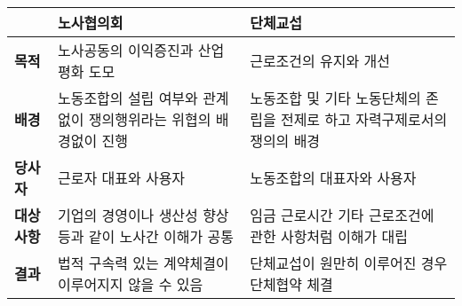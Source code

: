 \begin{tabular}{p{2cm} p{7cm} p{7cm}}
\toprule
 & \textbf{노사협의회} & \textbf{단체교섭} \\
\midrule
\textbf{목적} & 노사공동의 이익증진과 산업평화 도모 & 근로조건의 유지와 개선 \\ \midrule
\textbf{배경} & 노동조합의 설립 여부와 관계없이 쟁의행위라는 위협의 배경없이 진행 & 노동조합 및 기타 노동단체의 존립을 전제로 하고 자력구제로서의 쟁의의 배경 \\ \midrule
\textbf{당사자} & 근로자 대표와 사용자 & 노동조합의 대표자와 사용자 \\ \midrule
\textbf{대상사항} & 기업의 경영이나 생산성 향상 등과 같이 노사간 이해가 공통 & 임금 근로시간 기타 근로조건에 관한 사항처럼 이해가 대립 \\ \midrule
\textbf{결과} & 법적 구속력 있는 계약체결이 이루어지지 않을 수 있음 & 단체교섭이 원만히 이루어진 경우 단체협약 체결 \\
\bottomrule
\end{tabular}

